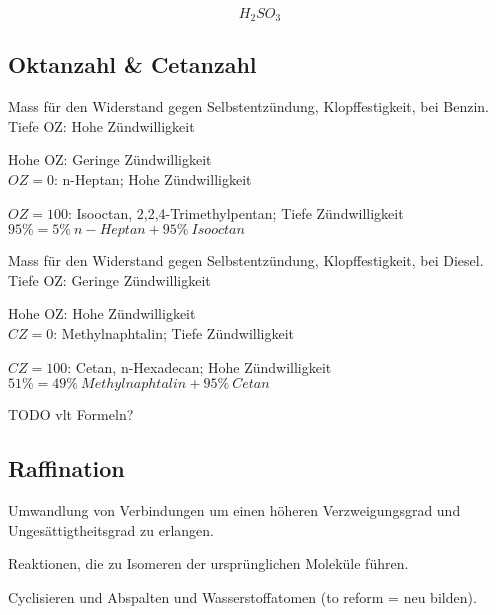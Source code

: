 \begin{definition}\leavevmode\\
	{\large\begin{equation}
		H_2SO_3
		\end{equation}}
\end{definition}

\subsection{Oktanzahl \& Cetanzahl}

\begin{definition}[Oktanzahl]
	Mass für den Widerstand gegen Selbstentzündung, Klopffestigkeit, bei Benzin. \\
	
	Tiefe OZ: Hohe Zündwilligkeit
	
	Hohe OZ: Geringe Zündwilligkeit\\
	
	$OZ=0$: n-Heptan; Hohe Zündwilligkeit
	
	$OZ=100$: Isooctan, 2,2,4-Trimethylpentan; Tiefe Zündwilligkeit\\
	
	$95\% = 5\%\  n-Heptan + 95\%\ Isooctan$
\end{definition}

\begin{definition}[Cetanzahl]
	Mass für den Widerstand gegen Selbstentzündung, Klopffestigkeit, bei Diesel. \\
	
	Tiefe OZ: Geringe Zündwilligkeit
	
	Hohe OZ: Hohe Zündwilligkeit\\
	
	$CZ=0$: Methylnaphtalin; Tiefe Zündwilligkeit
	
	$CZ=100$: Cetan, n-Hexadecan; Hohe Zündwilligkeit\\
	
	$51\% = 49\%\  Methylnaphtalin + 95\%\ Cetan$
\end{definition}

TODO vlt Formeln?

\subsection{Raffination}

Umwandlung von Verbindungen um einen höheren Verzweigungsgrad und Ungesättigtheitsgrad zu erlangen.

\begin{definition}[Isomerisieren]
	Reaktionen, die zu Isomeren der ursprünglichen Moleküle führen.
\end{definition}

\begin{definition}[Reformieren]
	Cyclisieren und Abspalten und Wasserstoffatomen (to reform = neu bilden).
\end{definition}
